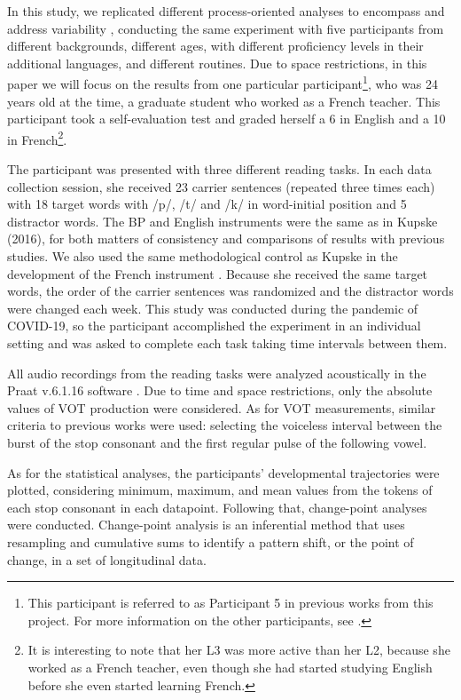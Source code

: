 In this study, we replicated different process-oriented analyses to encompass
and address variability \citep{garcia2013}, conducting the same experiment with
five participants from different backgrounds, different ages, with different
proficiency levels in their additional languages, and different routines. Due
to space restrictions, in this paper we will focus on the results from one
particular participant\footnote{This participant is referred to as Participant
5 in previous works from this project. For more information on the other
participants, see \citet{schereschewsky2021}.}, who was 24 years old at the time, a
graduate student who worked as a French teacher. This participant took a
self-evaluation test \cite{schereschewsky2021}%
and graded herself a 6 in English
and a 10 in French\footnote{It is interesting to note that her L3 was more
active than her L2, because she worked as a French teacher, even though she had
started studying English before she even started learning French.}.

The participant was presented with three different reading tasks. In each data
collection session, she received 23 carrier sentences (repeated three times
each) with 18 target words with /p/, /t/ and /k/ in word-initial position and 5
distractor words. The BP and English instruments were the same as in Kupske
(2016), for both matters of consistency and comparisons of results with
previous studies. We also used the same methodological control as Kupske in the
development of the French instrument \citep[cf.]{schereschewsky2021}. Because she
received the same target words, the order of the carrier sentences was
randomized and the distractor words were changed each week. This study was
conducted during the pandemic of COVID-19, so the participant accomplished the
experiment in an individual setting and was asked to complete each task taking
time intervals between them.

All audio recordings from the reading tasks were analyzed acoustically in the
Praat v.6.1.16 software \citep{boersma2019}. Due to time and space
restrictions, only the absolute values of VOT production were considered. As
for VOT measurements, similar criteria to previous works were used: selecting
the voiceless interval between the burst of the stop consonant and the first
regular pulse of the following vowel.

As for the statistical analyses, the participants' developmental trajectories
were plotted, considering minimum, maximum, and mean values from the tokens of
each stop consonant in each datapoint. Following that, change-point analyses
\citep[cf.]{taylorwayne,steenbeek2012,baba2014,han2018,englhardt2020,henry2021}
were conducted. Change-point analysis is an inferential method that uses resampling
and cumulative sums to identify a pattern shift, or the point of change, in a
set of longitudinal data.

